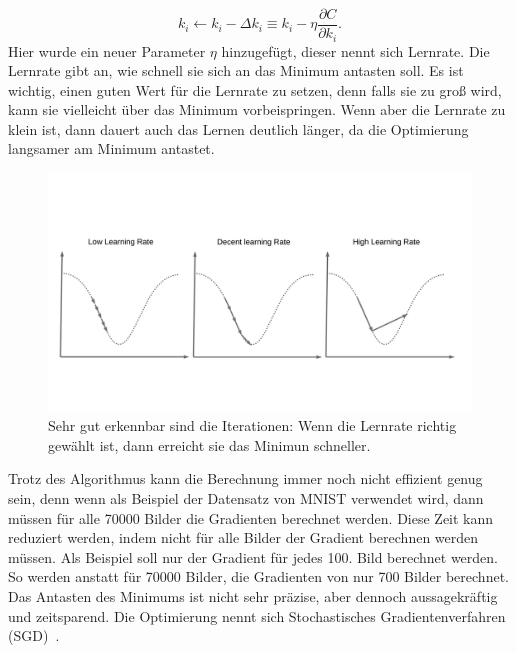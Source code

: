 \documentclass[11pt]{article}
\begin{document}
\begin{equation}
    k_i \leftarrow k_i - \Delta k_i \equiv  k_i - \eta \frac{\partial C}{\partial k_{i}}.
\end{equation}
Hier wurde ein neuer Parameter $\eta$ hinzugefügt, dieser nennt sich Lernrate. Die Lernrate gibt an, wie schnell sie sich an das Minimum antasten soll.
Es ist wichtig, einen guten Wert für die Lernrate zu setzen, denn falls sie zu groß wird, kann sie vielleicht über das Minimum vorbeispringen.
Wenn aber die Lernrate zu klein ist, dann dauert auch das Lernen deutlich länger, da die Optimierung langsamer am Minimum antastet.
\begin{figure}[h]
    \centering
    \includegraphics[width=400pt, keepaspectratio]{images/lrate}
    \caption[Einstellen der Lernrate~\cite{22}]{Sehr gut erkennbar sind die Iterationen: Wenn die Lernrate richtig gewählt ist, dann erreicht sie das Minimun schneller.~\cite{22}}
\end{figure}
Trotz des Algorithmus kann die Berechnung immer noch nicht effizient genug sein, denn wenn als
Beispiel der Datensatz von MNIST verwendet wird, dann müssen für alle 70000 Bilder die Gradienten berechnet werden. Diese Zeit kann reduziert werden,
indem nicht für alle Bilder der Gradient berechnen werden müssen. Als Beispiel soll nur der Gradient für jedes 100. Bild berechnet werden. So werden anstatt
für 70000 Bilder, die Gradienten von nur 700 Bilder berechnet. Das Antasten des Minimums ist nicht sehr präzise, aber dennoch aussagekräftig und zeitsparend. Die
Optimierung nennt sich Stochastisches Gradientenverfahren (SGD)~\cite{8}.
\end{document}
